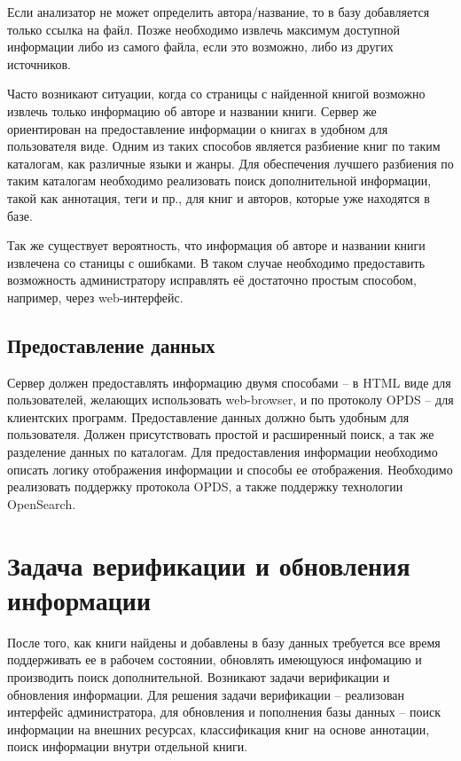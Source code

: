 \documentclass[a4paper, 12pt]{report}
\begin{document}
Если анализатор не может определить автора/название, то в базу добавляется только ссылка на файл. Позже необходимо извлечь максимум доступной информации либо из самого файла, если это возможно, либо из других источников.

Часто возникают ситуации, когда со страницы с найденной книгой возможно извлечь только информацию об авторе и названии книги. Сервер же ориентирован на предоставление информации о книгах в удобном для пользователя виде. Одним из таких способов является разбиение книг по таким каталогам, как различные языки и жанры. Для обеспечения лучшего разбиения по таким каталогам необходимо реализовать поиск дополнительной информации, такой как аннотация, теги и пр., для книг и авторов, которые уже находятся в базе.


Так же существует вероятность, что информация об авторе и названии книги извлечена со станицы с ошибками. В таком случае необходимо предоставить возможность администратору исправлять её достаточно простым способом, например, через web-интерфейс.


\subsection{Предоставление данных}

Сервер должен предоставлять информацию двумя способами -- в HTML виде для пользователей, желающих использовать web-browser, и по протоколу OPDS -- для клиентских программ. Предоставление данных должно быть удобным для пользователя. Должен присутствовать простой и расширенный поиск, а так же разделение данных по каталогам. Для предоставления информации необходимо описать логику отображения информации и способы ее отображения. Необходимо реализовать поддержку протокола OPDS, а также поддержку технологии OpenSearch.

\newpage
\section{Задача верификации и обновления информации}

После того, как книги найдены и добавлены в базу данных требуется все время поддерживать ее в рабочем состоянии, обновлять имеющуюся инфомацию и производить поиск дополнительной. Возникают задачи верификации и обновления информации. Для решения задачи верификации -- реализован интерфейс администратора, для обновления и пополнения базы данных -- поиск информации на внешних ресурсах, классификация книг на основе аннотации, поиск информации внутри отдельной книги.
\end{document}
